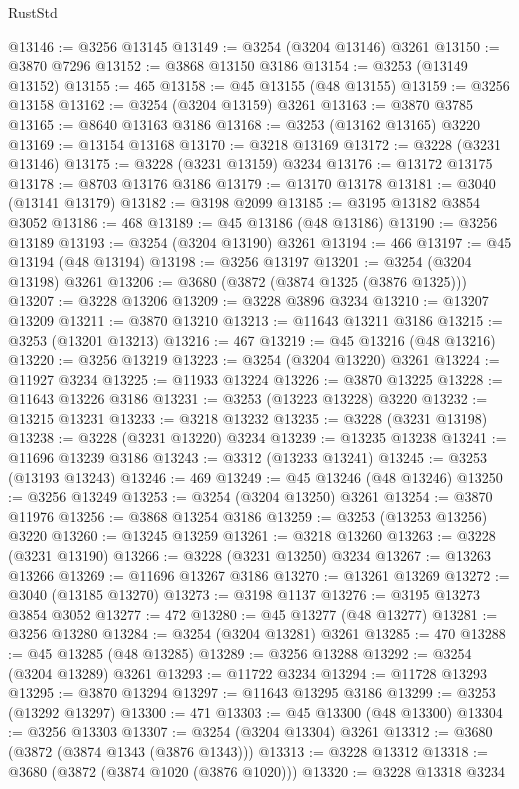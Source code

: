 \begin{lexlean}{RustStd}
\begin{coremodule}
@13146 := @3256 @13145
@13149 := @3254 (@3204 @13146) @3261
@13150 := @3870 @7296
@13152 := @3868 @13150 @3186
@13154 := @3253 (@13149 @13152)
@13155 := 465
@13158 := @45 @13155 (@48 @13155)
@13159 := @3256 @13158
@13162 := @3254 (@3204 @13159) @3261
@13163 := @3870 @3785
@13165 := @8640 @13163 @3186
@13168 := @3253 (@13162 @13165) @3220
@13169 := @13154 @13168
@13170 := @3218 @13169
@13172 := @3228 (@3231 @13146)
@13175 := @3228 (@3231 @13159) @3234
@13176 := @13172 @13175
@13178 := @8703 @13176 @3186
@13179 := @13170 @13178
@13181 := @3040 (@13141 @13179)
@13182 := @3198 @2099
@13185 := @3195 @13182 @3854 @3052
@13186 := 468
@13189 := @45 @13186 (@48 @13186)
@13190 := @3256 @13189
@13193 := @3254 (@3204 @13190) @3261
@13194 := 466
@13197 := @45 @13194 (@48 @13194)
@13198 := @3256 @13197
@13201 := @3254 (@3204 @13198) @3261
@13206 := @3680 (@3872 (@3874 @1325 (@3876 @1325)))
@13207 := @3228 @13206
@13209 := @3228 @3896 @3234
@13210 := @13207 @13209
@13211 := @3870 @13210
@13213 := @11643 @13211 @3186
@13215 := @3253 (@13201 @13213)
@13216 := 467
@13219 := @45 @13216 (@48 @13216)
@13220 := @3256 @13219
@13223 := @3254 (@3204 @13220) @3261
@13224 := @11927 @3234
@13225 := @11933 @13224
@13226 := @3870 @13225
@13228 := @11643 @13226 @3186
@13231 := @3253 (@13223 @13228) @3220
@13232 := @13215 @13231
@13233 := @3218 @13232
@13235 := @3228 (@3231 @13198)
@13238 := @3228 (@3231 @13220) @3234
@13239 := @13235 @13238
@13241 := @11696 @13239 @3186
@13243 := @3312 (@13233 @13241)
@13245 := @3253 (@13193 @13243)
@13246 := 469
@13249 := @45 @13246 (@48 @13246)
@13250 := @3256 @13249
@13253 := @3254 (@3204 @13250) @3261
@13254 := @3870 @11976
@13256 := @3868 @13254 @3186
@13259 := @3253 (@13253 @13256) @3220
@13260 := @13245 @13259
@13261 := @3218 @13260
@13263 := @3228 (@3231 @13190)
@13266 := @3228 (@3231 @13250) @3234
@13267 := @13263 @13266
@13269 := @11696 @13267 @3186
@13270 := @13261 @13269
@13272 := @3040 (@13185 @13270)
@13273 := @3198 @1137
@13276 := @3195 @13273 @3854 @3052
@13277 := 472
@13280 := @45 @13277 (@48 @13277)
@13281 := @3256 @13280
@13284 := @3254 (@3204 @13281) @3261
@13285 := 470
@13288 := @45 @13285 (@48 @13285)
@13289 := @3256 @13288
@13292 := @3254 (@3204 @13289) @3261
@13293 := @11722 @3234
@13294 := @11728 @13293
@13295 := @3870 @13294
@13297 := @11643 @13295 @3186
@13299 := @3253 (@13292 @13297)
@13300 := 471
@13303 := @45 @13300 (@48 @13300)
@13304 := @3256 @13303
@13307 := @3254 (@3204 @13304) @3261
@13312 := @3680 (@3872 (@3874 @1343 (@3876 @1343)))
@13313 := @3228 @13312
@13318 := @3680 (@3872 (@3874 @1020 (@3876 @1020)))
@13320 := @3228 @13318 @3234

\end{coremodule}
\end{lexlean}

